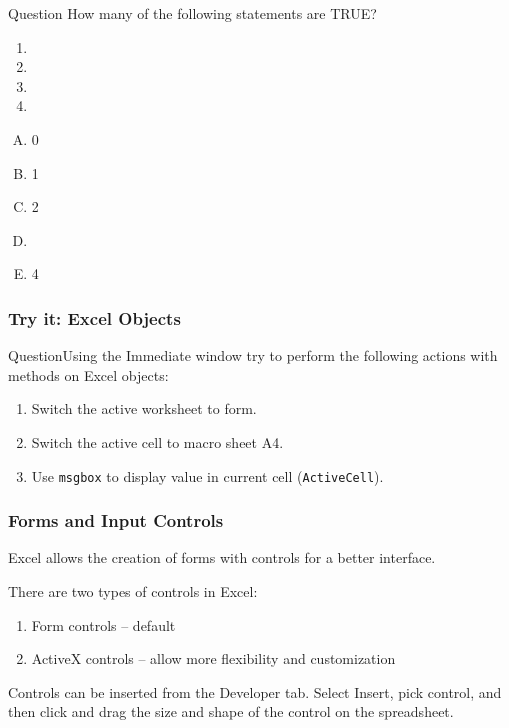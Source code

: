 \documentclass[xcolor=svgnames,handout]{beamer}
\newcommand{\ft}[1]{\frametitle{#1}}
\newcommand{\eol}{\\[1em]\pause}
\begin{document}
\begin{frame}
\begin{block}{Question}
How many of the following statements are TRUE?
\begin{enumerate}
\item {}
\item {}
\item {}
\item {}
\end{enumerate}
\begin{multicols}{5}
\begin{enumerate}[A)]
\item 0 
\item 1
\item 2
\item \textbf<6>{\textit<6>{{}}}
\item 4
\end{enumerate}
\end{multicols}
\end{block}
\end{frame}



\begin{frame}[fragile]
\ft{Try it: Excel Objects}
\begin{exampleblock}
{Question}Using the Immediate window try to perform the following actions with methods on Excel objects:
\begin{enumerate}
\item Switch the active worksheet to form.
\item Switch the active cell to macro sheet A4.
\item Use {\tt msgbox} to display value in current cell ({\tt ActiveCell}).
\end{enumerate}
\end{exampleblock}
\end{frame}




\begin{frame}[fragile]
\ft{Forms and Input Controls}
Excel allows the creation of forms with controls for a better interface.\eol

There are two types of controls in Excel:
\begin{enumerate}
\item Form controls -- default
\item ActiveX controls -- allow more flexibility and customization
\end{enumerate}

Controls can be inserted from the Developer tab. Select Insert, pick control, and then click and drag the size and shape of the control on the spreadsheet.

\end{frame}
\end{document}
